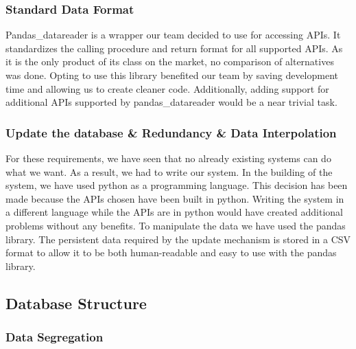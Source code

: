 \documentclass[main.tex]{subfiles}
\begin{document}
\subsubsection*{Standard Data Format}
Pandas\_datareader \cite{pandas_datareader} is a wrapper our team decided to use for accessing APIs. It standardizes the calling procedure and return format for all supported APIs. As it is the only product of its class on the market, no comparison of alternatives was done. Opting to use this library benefited our team by saving development time and allowing us to create cleaner code. Additionally, adding support for additional APIs supported by pandas\_datareader would be a near trivial task.
\newline
    
\subsubsection*{Update the database \& Redundancy \& Data Interpolation}   
For these requirements, we have seen that no already existing systems can do what we want. As a result, we had to write our system.
In the building of the system, we have used python as a programming language. This decision has been made because the APIs chosen have been built in python. Writing the system in a different language while the APIs are in python would have created additional problems without any benefits. To manipulate the data we have used the pandas library. 
The persistent data required by the update mechanism is stored in a CSV \cite{csv_iso} format to allow it to be both human-readable and easy to use with the pandas library.

\subsection{Database Structure}
\label{DB Structure}

\subsubsection{Data Segregation}
\end{document}
